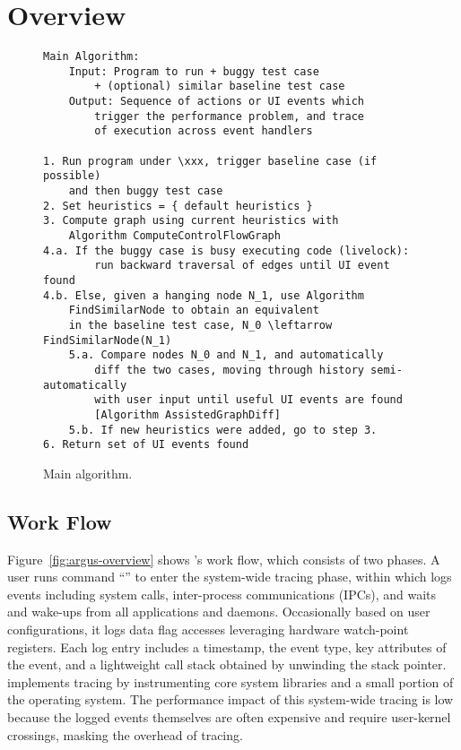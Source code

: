 \section{Overview} \label{sec:overview}


\begin{figure}[tb]
    \centering
\begin{verbatim}
Main Algorithm:
    Input: Program to run + buggy test case
        + (optional) similar baseline test case
    Output: Sequence of actions or UI events which
        trigger the performance problem, and trace
        of execution across event handlers

1. Run program under \xxx, trigger baseline case (if possible)
    and then buggy test case
2. Set heuristics = { default heuristics }
3. Compute graph using current heuristics with
    Algorithm ComputeControlFlowGraph
4.a. If the buggy case is busy executing code (livelock):
        run backward traversal of edges until UI event found
4.b. Else, given a hanging node N_1, use Algorithm
    FindSimilarNode to obtain an equivalent
    in the baseline test case, N_0 \leftarrow FindSimilarNode(N_1)
    5.a. Compare nodes N_0 and N_1, and automatically
        diff the two cases, moving through history semi-automatically
        with user input until useful UI events are found
        [Algorithm AssistedGraphDiff]
    5.b. If new heuristics were added, go to step 3.
6. Return set of UI events found
\end{verbatim}
    \caption{Main \xxx algorithm.}
    \label{fig:alg-main}
\end{figure}

\subsection{\xxx Work Flow}

\begin{figure*}[tb]
    \centering
	
    \caption{\xxx Work Flow}
    \label{fig:argus-overview}
\end{figure*}

Figure~\ref{fig:argus-overview} shows \xxx's work flow, which consists of two
phases.  A user runs command ``'' to enter the system-wide
tracing phase, within which \xxx logs events including system calls,
inter-process communications (IPCs), and waits and wake-ups from all
applications and daemons.  Occasionally based on user configurations, it logs
data flag accesses leveraging hardware watch-point registers.  Each log entry
includes a timestamp, the event type, key attributes of the event, and a
lightweight call stack obtained by unwinding the stack pointer.  \xxx
implements tracing by instrumenting core system libraries and a small portion
of the operating system.  The performance impact of this system-wide tracing is
low because the logged events themselves are often expensive and require
user-kernel crossings, masking the overhead of tracing.

